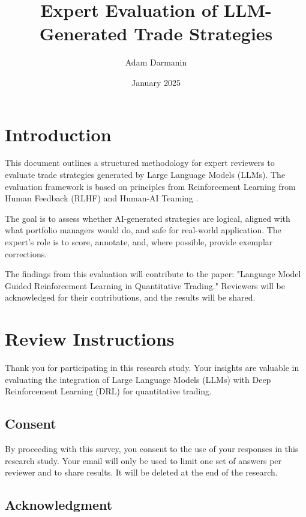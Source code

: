 \documentclass[8pt]{scrartcl}
\title{Expert Evaluation of LLM-Generated Trade Strategies}
\author{Adam Darmanin}
\date{January 2025}
\begin{document}
\maketitle

\section{Introduction}

This document outlines a structured methodology for expert reviewers to evaluate trade strategies generated by Large Language Models (LLMs). The evaluation framework is based on principles from Reinforcement Learning from Human Feedback (RLHF) \citep{Retzlaff2024HumanintheLoopRL} and Human-AI Teaming \citep{vats2024surveyhumanaiteaminglarge, xie2024text2rewardrewardshapinglanguage}.

The goal is to assess whether AI-generated strategies are logical, aligned with what portfolio managers would do, and safe for real-world application. The expert’s role is to score, annotate, and, where possible, provide exemplar corrections.

The findings from this evaluation will contribute to the paper: "Language Model Guided Reinforcement Learning in Quantitative Trading." Reviewers will be acknowledged for their contributions, and the results will be shared.

\section{Review Instructions}

Thank you for participating in this research study. Your insights are valuable in evaluating the integration of Large Language Models (LLMs) with Deep Reinforcement Learning (DRL) for quantitative trading.

\subsection{Consent}

By proceeding with this survey, you consent to the use of your responses in this research study. Your email will only be used to limit one set of answers per reviewer and to share results. It will be deleted at the end of the research.

\subsection{Acknowledgment}
\end{document}
